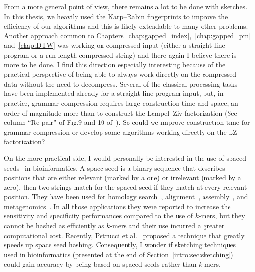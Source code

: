 From a more general point of view, there remains a lot to be done with sketches. In this thesis, we heavily used the Karp--Rabin fingerprints to improve the efficiency of our algorithms and this is likely extendable to many other problems. Another approach common to Chapters~\ref*{chap:gapped_index},~\ref*{chap:gapped_pm} and~\ref*{chap:DTW} was working on compressed input (either a straight-line program or a run-length compressed string) and there again I believe there is more to be done. I find this direction especially interesting because of the practical perspective of being able to always work directly on the compressed data without the need to decompress. Several of the classical processing tasks have been implemented already for a straight-line program input, but, in practice, grammar compression requires large construction time and space, an order of magnitude more than to construct the Lempel--Ziv factorization (See column ``Re-pair'' of Fig.9 and 10 of~\cite{DBLP:journals/jcss/ClaudeNP21}). So could we improve construction time for grammar compression or develop some algorithms working directly on the LZ factorization?


On the more practical side, I would personally be interested in the use of spaced seeds~\cite{li2004patternhunter} in bioinformatics. A space seed is a binary sequence that describes positions that are either relevant (marked by a one) or irrelevant (marked by a zero), then two strings match for the spaced seed if they match at every relevant position.
They have been used for homology search~\cite{ma2002patternhunter}, alignment~\cite{david2011shrimp2}, assembly~\cite{birol2015spaced}, and metagenomics~\cite{bvrinda2015spaced}. In all those applications they were reported to increase the sensitivity and specificity performances compared to the use of $k$-mers, but they cannot be hashed as efficiently as $k$-mers and their use incurred a greater computational cost. Recently, Petrucci et al.~\cite{petrucci2020iterative} proposed a technique that greatly speeds up space seed hashing. Consequently, I wonder if sketching techniques used in bioinformatics (presented at the end of Section~\ref{intro:sec:sketching}) could gain accuracy by being based on spaced seeds rather than $k$-mers.

\backmatter
